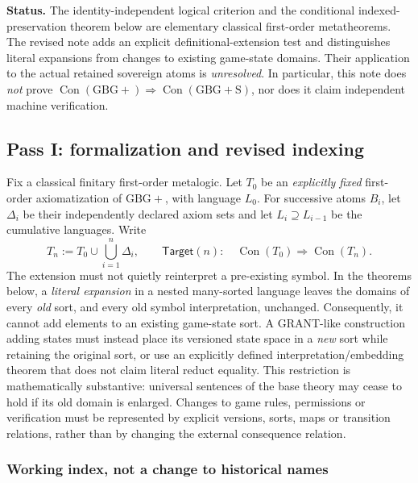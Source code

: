 \documentclass[11pt,letterpaper]{article}
\theoremstyle{definition}\newtheorem{definition}[theorem]{Definition}\newtheorem{example}[theorem]{Example}
\theoremstyle{remark}\newtheorem{remark}[theorem]{Remark}
\newcommand{\Con}{\operatorname{Con}}
\providecommand{\Gb}{\mathrm{GBG+}}
\providecommand{\GG}{\mathrm{GBG+S}}
\begin{document}
\vspace{0.3em}
\begin{tcolorbox}[colback=gray!6,colframe=gray!45,boxrule=0.4pt,arc=1mm]
\small\textbf{Status.} The identity-independent logical criterion and the conditional indexed-preservation theorem below are elementary classical first-order metatheorems. The revised note adds an explicit definitional-extension test and distinguishes literal expansions from changes to existing game-state domains. Their application to the actual retained sovereign atoms is \emph{unresolved}. In particular, this note does \emph{not} prove \(\Con(\Gb)\Rightarrow\Con(\GG)\), nor does it claim independent machine verification.
\end{tcolorbox}




\subsection{Pass I: formalization and revised indexing}

Fix a classical finitary first-order metalogic. Let \(T_0\) be an \emph{explicitly fixed} first-order axiomatization of \(\Gb\), with language \(L_0\). For successive atoms \(B_i\), let \(\Delta_i\) be their independently declared axiom sets and let \(L_i\supseteq L_{i-1}\) be the cumulative languages. Write
\begin{equation}\label{induct:eq:prefix}
T_n := T_0\cup\bigcup_{i=1}^{n}\Delta_i, \qquad
\mathsf{Target}(n):\quad \Con(T_0)\Longrightarrow\Con(T_n).
\end{equation}
The extension must not quietly reinterpret a pre-existing symbol. In the theorems below, a \emph{literal expansion} in a nested many-sorted language leaves the domains of every \emph{old} sort, and every old symbol interpretation, unchanged. Consequently, it cannot add elements to an existing game-state sort. A GRANT-like construction adding states must instead place its versioned state space in a \emph{new} sort while retaining the original sort, or use an explicitly defined interpretation/embedding theorem that does not claim literal reduct equality. This restriction is mathematically substantive: universal sentences of the base theory may cease to hold if its old domain is enlarged. Changes to game rules, permissions or verification must be represented by explicit versions, sorts, maps or transition relations, rather than by changing the external consequence relation.

\subsubsection{Working index, not a change to historical names}
\end{document}
